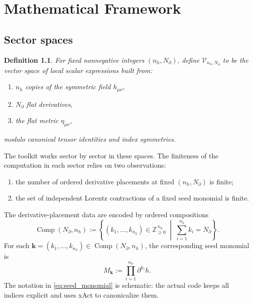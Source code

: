 \documentclass[11pt]{report}
\numberwithin{equation}{chapter}
\newtheorem{definition}{Definition}[chapter]
\newcommand{\Vspace}[2]{\mathcal{V}_{#1,#2}}
\newcommand{\Comp}{\operatorname{Comp}}
\begin{document}
\chapter{Mathematical Framework}

\section{Sector spaces}

\begin{definition}
For fixed nonnegative integers \((n_h,N_\partial)\), define \(\Vspace{n_h}{N_\partial}\) to be the vector space of local scalar expressions built from:
\begin{enumerate}[label=\roman*.]
\item \(n_h\) copies of the symmetric field \(h_{\mu\nu}\),
\item \(N_\partial\) flat derivatives,
\item the flat metric \(\eta_{\mu\nu}\),
\end{enumerate}
modulo canonical tensor identities and index symmetries.
\end{definition}

The toolkit works sector by sector in these spaces.
The finiteness of the computation in each sector relies on two observations:
\begin{enumerate}[label=\roman*.]
\item the number of ordered derivative placements at fixed \((n_h,N_\partial)\) is finite;
\item the set of independent Lorentz contractions of a fixed seed monomial is finite.
\end{enumerate}

The derivative-placement data are encoded by ordered compositions
\begin{equation}
  \Comp(N_\partial,n_h)
  :=
  \left\{
    (k_1,\dots,k_{n_h}) \in \mathbb{Z}_{\ge 0}^{\,n_h}
    \;\middle|\;
    \sum_{i=1}^{n_h} k_i = N_\partial
  \right\}.
  \label{eq:composition_set}
\end{equation}
For each \(\bm{k}=(k_1,\dots,k_{n_h}) \in \Comp(N_\partial,n_h)\), the corresponding seed monomial is
\begin{equation}
  M_{\bm{k}}
  :=
  \prod_{i=1}^{n_h} \partial^{k_i} h.
  \label{eq:seed_monomial}
\end{equation}
The notation in \eqref{eq:seed_monomial} is schematic: the actual code keeps all indices explicit and uses xAct to canonicalize them.
\end{document}
